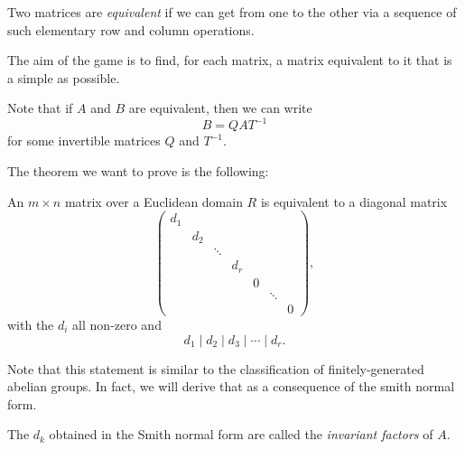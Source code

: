\documentclass[a4paper]{article}
\begin{document}
\begin{defi}
  Two matrices are \emph{equivalent} if we can get from one to the other via a sequence of such elementary row and column operations.
\end{defi}

The aim of the game is to find, for each matrix, a matrix equivalent to it that is a simple as possible.

Note that if $A$ and $B$ are equivalent, then we can write
\[
  B = QAT^{-1}
\]
for some invertible matrices $Q$ and $T^{-1}$.

The theorem we want to prove is the following:
\begin{thm}
  An $m \times n$ matrix over a Euclidean domain $R$ is equivalent to a diagonal matrix
  \[
    \begin{pmatrix}
      d_1\\
      & d_2\\
      & & \ddots\\
      & & & d_r\\
      & & & & 0\\
      & & & & & \ddots\\
      & & & & & & 0
    \end{pmatrix},
  \]
  with the $d_i$ all non-zero and
  \[
    d_1 \mid d_2 \mid d_3 \mid \cdots \mid d_r.
  \]
\end{thm}
Note that this statement is similar to the classification of finitely-generated abelian groups. In fact, we will derive that as a consequence of the smith normal form.

\begin{defi}
  The $d_k$ obtained in the Smith normal form are called the \emph{invariant factors} of $A$.
\end{defi}
\end{document}
